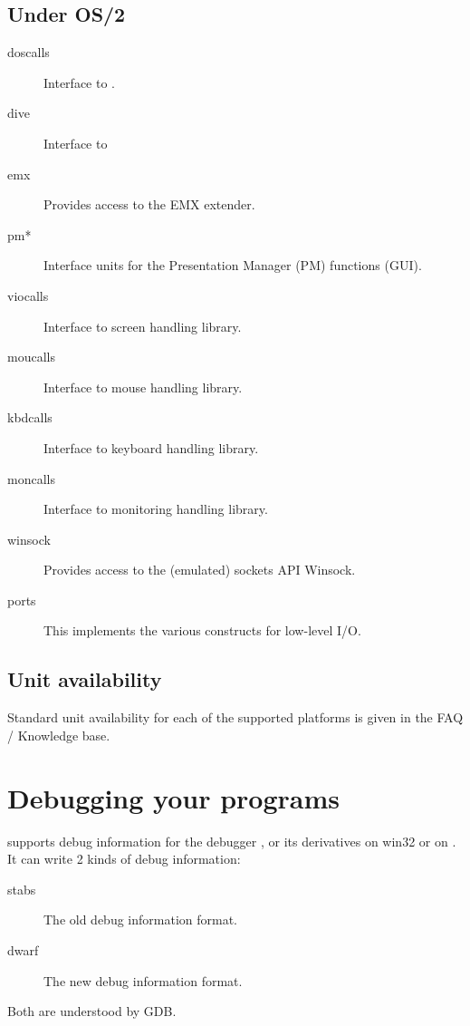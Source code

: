 \section{Under OS/2}
\begin{description}
\item[doscalls] Interface to .
\item[dive] Interface to 
\item[emx] Provides access to the EMX extender.
\item[pm*] Interface units for the Presentation Manager (PM) functions (GUI).
\item[viocalls] Interface to  screen handling library.
\item[moucalls] Interface to  mouse handling library.
\item[kbdcalls] Interface to  keyboard handling library.
\item[moncalls] Interface to  monitoring handling library.
\item[winsock] Provides access to the (emulated) \windows sockets API Winsock.
\item[ports] This implements the various  constructs for low-level
I/O.
\end{description}

\section{Unit availability}

Standard unit availability for each of the supported platforms
is given in the FAQ / Knowledge base.


\chapter{Debugging your programs}

\fpc supports debug information for the \gnu debugger , or
its derivatives  on win32 or  on \linux.
It can write 2 kinds of debug information:
\begin{description}
\item[stabs] The old debug information format.
\item[dwarf] The new debug information format.
\end{description}
Both are understood by GDB.

